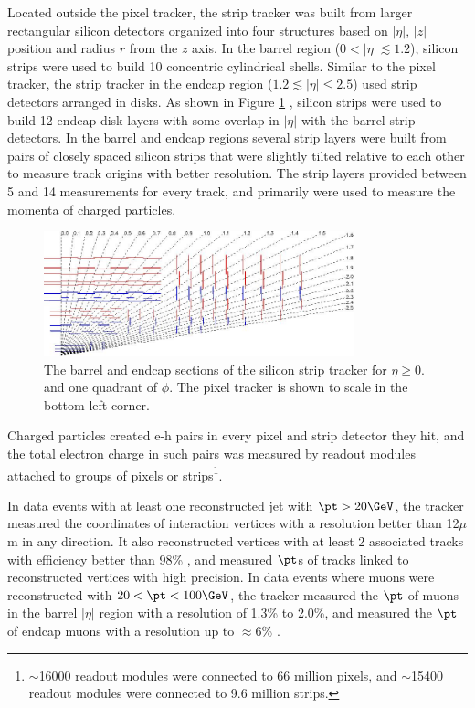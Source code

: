 Located outside the pixel tracker, the strip tracker was built from larger rectangular silicon detectors 
organized into four structures based on $|\eta|$, $|z|$ position and radius $r$ from the $z$ axis.  In the barrel region 
($0 < |\eta| \lesssim 1.2$), silicon strips were used to build 10 concentric cylindrical shells.  Similar to the pixel tracker, the strip tracker in 
the endcap region ($1.2 \lesssim |\eta| \leq 2.5$) used strip detectors arranged in disks.  As shown in Figure \ref{fig:stripTracker} 
\cite{cmsTDR}, silicon strips were used to build 12 endcap disk layers with some overlap in $|\eta|$ with the 
barrel strip detectors.  In the barrel and endcap regions several strip layers were built from pairs of closely spaced 
silicon strips that were slightly tilted relative to each other to measure track origins with better resolution.  The 
strip layers provided between 5 and 14 measurements for every track, and primarily were used to measure the momenta 
of charged particles.

\begin{figure}[ht]
	\centering
	\includegraphics[width=0.8\textwidth]{figures/siliconStripAndPixelDetectorTwoDimView.png}
	\caption{The barrel and endcap sections of the silicon strip tracker for $\eta \geq 0.$ and one quadrant of $\phi$.  
	The pixel tracker is shown to scale in the bottom left corner.}
	\label{fig:stripTracker}
\end{figure}

Charged particles created e-h pairs in every pixel and strip detector they hit, and the total electron charge in such pairs was measured by readout 
modules attached to groups of pixels or strips\footnote{$\sim$16000 readout modules were connected to 66 million pixels, 
and $\sim$15400 readout modules were connected to 9.6 million strips.}.  


In data events with at least one reconstructed jet with $\pt > 20\GeV$, the tracker measured the coordinates of interaction vertices 
with a resolution better than 12$\mu$m in any direction.  It also 
reconstructed vertices with at least 2 associated tracks with efficiency better than 98\% \cite{trackerPerformanceInCollisions}, 
and measured $\pt$s of tracks linked to reconstructed vertices with high precision.  In data events where muons were reconstructed 
with $20 < \pt < 100\GeV$, the tracker measured the $\pt$ of muons in the barrel $|\eta|$ region with a resolution of 1.3\% to 2.0\%, 
and measured the $\pt$ of endcap muons with a resolution up to $\approx$6\% \cite{muonRecoFirstCollisions}.

